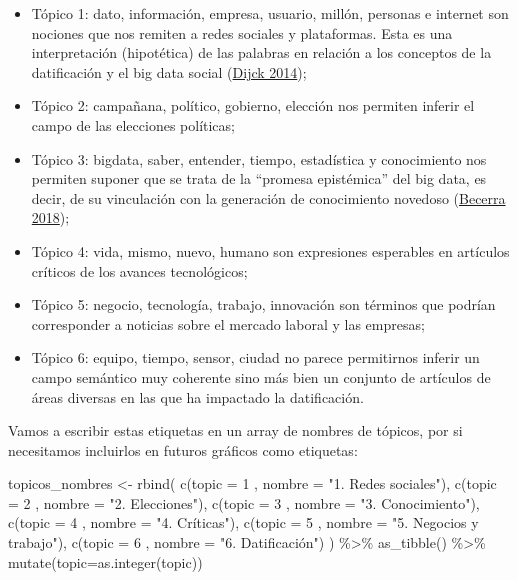\documentclass[
]{book}
\newenvironment{Shaded}{\begin{snugshade}}{\end{snugshade}}
\newcommand{\AttributeTok}[1]{\textcolor[rgb]{0.77,0.63,0.00}{#1}}
\newcommand{\DecValTok}[1]{\textcolor[rgb]{0.00,0.00,0.81}{#1}}
\newcommand{\FunctionTok}[1]{\textcolor[rgb]{0.00,0.00,0.00}{#1}}
\newcommand{\NormalTok}[1]{#1}
\newcommand{\OtherTok}[1]{\textcolor[rgb]{0.56,0.35,0.01}{#1}}
\newcommand{\SpecialCharTok}[1]{\textcolor[rgb]{0.00,0.00,0.00}{#1}}
\newcommand{\StringTok}[1]{\textcolor[rgb]{0.31,0.60,0.02}{#1}}
\providecommand{\tightlist}{%
  \setlength{\itemsep}{0pt}\setlength{\parskip}{0pt}}
\begin{document}
\begin{itemize}
\tightlist
\item
  Tópico 1: dato, información, empresa, usuario, millón, personas e internet son nociones que nos remiten a redes sociales y plataformas. Esta es una interpretación (hipotética) de las palabras en relación a los conceptos de la datificación y el big data social (\protect\hyperlink{ref-VanDijck2014}{Dijck 2014});
\item
  Tópico 2: campañana, político, gobierno, elección nos permiten inferir el campo de las elecciones políticas;
\item
  Tópico 3: bigdata, saber, entender, tiempo, estadística y conocimiento nos permiten suponer que se trata de la ``promesa epistémica'' del big data, es decir, de su vinculación con la generación de conocimiento novedoso (\protect\hyperlink{ref-Becerra2018}{Becerra 2018});
\item
  Tópico 4: vida, mismo, nuevo, humano son expresiones esperables en artículos críticos de los avances tecnológicos;
\item
  Tópico 5: negocio, tecnología, trabajo, innovación son términos que podrían corresponder a noticias sobre el mercado laboral y las empresas;
\item
  Tópico 6: equipo, tiempo, sensor, ciudad no parece permitirnos inferir un campo semántico muy coherente sino más bien un conjunto de artículos de áreas diversas en las que ha impactado la datificación.
\end{itemize}

Vamos a escribir estas etiquetas en un array de nombres de tópicos, por si necesitamos incluirlos en futuros gráficos como etiquetas:

\begin{Shaded}
\begin{Highlighting}[]
\NormalTok{topicos\_nombres }\OtherTok{\textless{}{-}} \FunctionTok{rbind}\NormalTok{( }
  \FunctionTok{c}\NormalTok{(}\AttributeTok{topic =} \DecValTok{1}\NormalTok{ , }\AttributeTok{nombre =} \StringTok{"1. Redes sociales"}\NormalTok{),}
  \FunctionTok{c}\NormalTok{(}\AttributeTok{topic =} \DecValTok{2}\NormalTok{ , }\AttributeTok{nombre =} \StringTok{"2. Elecciones"}\NormalTok{),}
  \FunctionTok{c}\NormalTok{(}\AttributeTok{topic =} \DecValTok{3}\NormalTok{ , }\AttributeTok{nombre =} \StringTok{"3. Conocimiento"}\NormalTok{),}
  \FunctionTok{c}\NormalTok{(}\AttributeTok{topic =} \DecValTok{4}\NormalTok{ , }\AttributeTok{nombre =} \StringTok{"4. Críticas"}\NormalTok{),}
  \FunctionTok{c}\NormalTok{(}\AttributeTok{topic =} \DecValTok{5}\NormalTok{ , }\AttributeTok{nombre =} \StringTok{"5. Negocios y trabajo"}\NormalTok{),}
  \FunctionTok{c}\NormalTok{(}\AttributeTok{topic =} \DecValTok{6}\NormalTok{ , }\AttributeTok{nombre =} \StringTok{"6. Datificación"}\NormalTok{)}
\NormalTok{) }\SpecialCharTok{\%\textgreater{}\%} \FunctionTok{as\_tibble}\NormalTok{() }\SpecialCharTok{\%\textgreater{}\%} \FunctionTok{mutate}\NormalTok{(}\AttributeTok{topic=}\FunctionTok{as.integer}\NormalTok{(topic))}
\end{Highlighting}
\end{Shaded}
\end{document}
